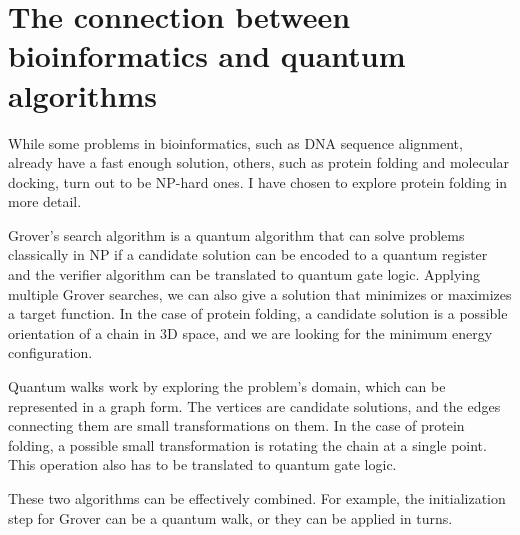 \section{The connection between bioinformatics and quantum algorithms}

While some problems in bioinformatics, such as DNA sequence alignment, already have a fast enough solution, others, such as protein folding and molecular docking, turn out to be NP-hard ones. I have chosen to explore protein folding in more detail.

Grover's search algorithm is a quantum algorithm that can solve problems classically in NP if a candidate solution can be encoded to a quantum register and the verifier algorithm can be translated to quantum gate logic. Applying multiple Grover searches, we can also give a solution that minimizes or maximizes a target function. In the case of protein folding, a candidate solution is a possible orientation of a chain in 3D space, and we are looking for the minimum energy configuration.

Quantum walks work by exploring the problem's domain, which can be represented in a graph form. The vertices are candidate solutions, and the edges connecting them are small transformations on them. In the case of protein folding, a possible small transformation is rotating the chain at a single point. This operation also has to be translated to quantum gate logic.

These two algorithms can be effectively combined. For example, the initialization step for Grover can be a quantum walk, or they can be applied in turns.